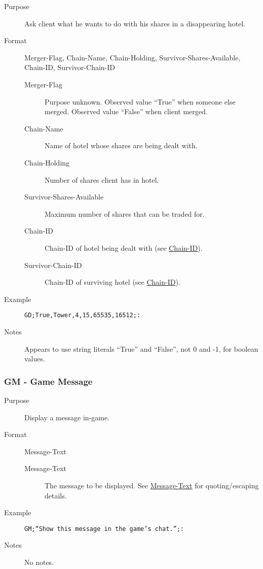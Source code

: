 \documentclass{article}
\providecommand{\wiredata}[1]{\texttt{{#1}}}
\begin{document}
\begin{description}
  \item[Purpose] Ask client what he wants to do with his shares in a disappearing hotel.
  \item[Format] Merger-Flag, Chain-Name, Chain-Holding, Survivor-Shares-Available, Chain-ID, Survivor-Chain-ID
  \begin{description}
    \item[Merger-Flag] Purpose unknown. Observed value ``True'' when someone else merged. Observed value ``False'' when client merged.
    \item[Chain-Name] Name of hotel whose shares are being dealt with.
    \item[Chain-Holding] Number of shares client has in hotel.
    \item[Survivor-Shares-Available] Maximum number of shares that can be traded for.
    \item[Chain-ID] Chain-ID of hotel being dealt with (see \hyperref[ssub:chain_id]{Chain-ID}).
    \item[Survivor-Chain-ID] Chain-ID of surviving hotel (see \hyperref[ssub:chain_id]{Chain-ID}).
  \end{description}
  \item[Example] \wiredata{GD;True,Tower,4,15,65535,16512;:}
  \item[Notes] Appears to use string literals ``True'' and ``False'', not 0 and -1, for boolean values.
\end{description}


\subsubsection{GM - Game Message} %
\label{ssub:gm_game_message}

\begin{description}
  \item[Purpose] Display a message in-game.
  \item[Format] Message-Text
  \begin{description}
    \item[Message-Text] The message to be displayed. See \hyperref[ssub:message_text]{Message-Text} for quoting/escaping details.
  \end{description}
  \item[Example] \wiredata{GM;``Show this message in the game's chat.'';:}
  \item[Notes] No notes.
\end{description}
\end{document}
